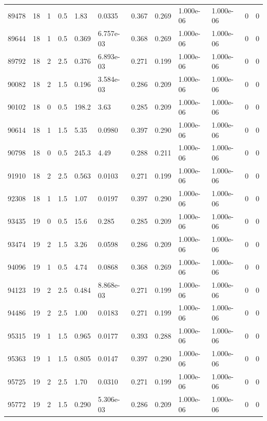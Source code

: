 \documentclass[preview]{standalone}
\begin{document}
{{{{\begin{tabular}{L{1.2cm}C{1.2cm} C{0.3cm}C{0.5cm} C{1.4cm}C{1.4cm} C{1.4cm}C{1.4cm} C{1.6cm}C{1.6cm} C{1.6cm}C{1.6cm}}
  89478  &    18  & 1     & 0.5 &  1.83  & 0.0335  &  0.367&   0.269& 1.000e-06 & 1.000e-06   &  0 & 0  \\ 
  89644  &    18  & 1     & 0.5 &  0.369  & 6.757e-03  &  0.368&   0.269& 1.000e-06 & 1.000e-06   &  0 & 0  \\ 
  89792  &    18  & 2     & 2.5 &  0.376  & 6.893e-03  &  0.271&   0.199& 1.000e-06 & 1.000e-06   &  0 & 0  \\ 
  90082  &    18  & 2     & 1.5 &  0.196  & 3.584e-03  &  0.286&   0.209& 1.000e-06 & 1.000e-06   &  0 & 0  \\ 
  90102  &    18  & 0     & 0.5 &  198.2  & 3.63  &  0.285&   0.209& 1.000e-06 & 1.000e-06   &  0 & 0  \\ 
  90614  &    18  & 1     & 1.5 &  5.35  & 0.0980  &  0.397&   0.290& 1.000e-06 & 1.000e-06   &  0 & 0  \\ 
  90798  &    18  & 0     & 0.5 &  245.3  & 4.49  &  0.288&   0.211& 1.000e-06 & 1.000e-06   &  0 & 0  \\ 
  91910  &    18  & 2     & 2.5 &  0.563  & 0.0103  &  0.271&   0.199& 1.000e-06 & 1.000e-06   &  0 & 0  \\ 
  92308  &    18  & 1     & 1.5 &  1.07  & 0.0197  &  0.397&   0.290& 1.000e-06 & 1.000e-06   &  0 & 0  \\ 
  93435  &    19  & 0     & 0.5 &  15.6  & 0.285  &  0.285&   0.209& 1.000e-06 & 1.000e-06   &  0 & 0  \\ 
  93474  &    19  & 2     & 1.5 &  3.26  & 0.0598  &  0.286&   0.209& 1.000e-06 & 1.000e-06   &  0 & 0  \\ 
  94096  &    19  & 1     & 0.5 &  4.74  & 0.0868  &  0.368&   0.269& 1.000e-06 & 1.000e-06   &  0 & 0  \\ 
  94123  &    19  & 2     & 2.5 &  0.484  & 8.868e-03  &  0.271&   0.199& 1.000e-06 & 1.000e-06   &  0 & 0  \\ 
  94486  &    19  & 2     & 2.5 &  1.00  & 0.0183  &  0.271&   0.199& 1.000e-06 & 1.000e-06   &  0 & 0  \\ 
  95315  &    19  & 1     & 1.5 &  0.965  & 0.0177  &  0.393&   0.288& 1.000e-06 & 1.000e-06   &  0 & 0  \\ 
  95363  &    19  & 1     & 1.5 &  0.805  & 0.0147  &  0.397&   0.290& 1.000e-06 & 1.000e-06   &  0 & 0  \\ 
  95725  &    19  & 2     & 2.5 &  1.70  & 0.0310  &  0.271&   0.199& 1.000e-06 & 1.000e-06   &  0 & 0  \\ 
  95772  &    19  & 2     & 1.5 &  0.290  & 5.306e-03  &  0.286&   0.209& 1.000e-06 & 1.000e-06   &  0 & 0  \\ 

\end{tabular}}}}}
\end{document}
